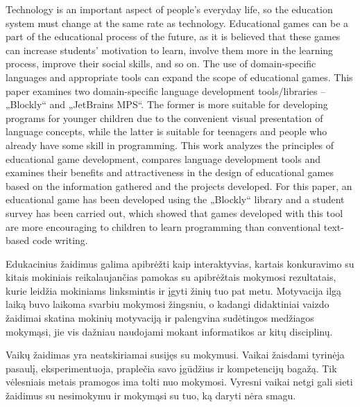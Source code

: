 \documentclass{VUMIFPSkursinis}
\begin{document}
Technology is an important aspect of people's everyday life, so the education system must change at the same rate as technology. Educational games can be a part of the educational process of the future, as it is believed that these games can increase students' motivation to learn, involve them more in the learning process, improve their social skills, and so on. The use of domain-specific languages and appropriate tools can expand the scope of educational games. This paper examines two domain-specific language development tools/libraries -- „Blockly“ and „JetBrains MPS“. The former is more suitable for developing programs for younger children due to the convenient visual presentation of language concepts, while the latter is suitable for teenagers and people who already have some skill in programming. This work analyzes the principles of educational game development, compares language development tools and examines their benefits and attractiveness in the design of educational games based on the information gathered and the projects developed. For this paper, an educational game has been developed using the „Blockly“ library and a student survey has been carried out, which showed that games developed with this tool are more encouraging to children to learn programming than conventional text-based code writing.



\tableofcontents




Edukacinius žaidimus galima apibrėžti kaip interaktyvias, kartais konkuravimo su kitais mokiniais reikalaujančias pamokas su apibrėžtais mokymosi rezultatais, kurie leidžia mokiniams linksmintis ir įgyti žinių tuo pat metu. Motyvacija ilgą laiką buvo laikoma svarbiu mokymosi žingsniu, o kadangi didaktiniai vaizdo žaidimai skatina mokinių motyvaciją ir palengvina sudėtingos medžiagos mokymąsi, jie vis dažniau naudojami mokant informatikos ar kitų disciplinų. \cite{frankovic2018serious}

Vaikų žaidimas yra neatskiriamai susijęs su mokymusi. Vaikai žaisdami tyrinėja pasaulį, eksperimentuoja, praplečia savo įgūdžius ir kompetencijų bagažą. Tik vėlesniais metais pramogos ima tolti nuo mokymosi. Vyresni vaikai netgi gali sieti žaidimus su nesimokymu ir mokymąsi su tuo, ką daryti nėra smagu. \cite{ritterfeld2009serious}
\end{document}
